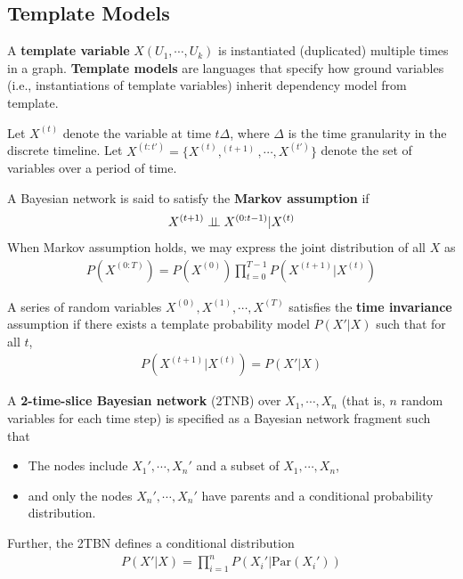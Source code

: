\documentclass[11pt]{article}
\newcommand{\pa}[0]{\text{Par}}
\begin{document}
	\subsection{Template Models}
	\begin{definition}
		A \textbf{template variable} $X(U_1, \cdots, U_k)$ is instantiated (duplicated) multiple times in a graph.
		\textbf{Template models} are languages that specify how ground variables (i.e., instantiations of template variables) inherit dependency model from template.
	\end{definition}
	
	\begin{notation}
		Let $X^{(t)}$ denote the variable at time $t \Delta$, where $\Delta$ is the time granularity in the discrete timeline.
		Let $X^{(t:t')} = \{X^{(t)}, ^{(t+1)}, \cdots, X^{(t')}\}$ denote the set of variables over a period of time.
	\end{notation}
	
	\begin{definition}
		A Bayesian network is said to satisfy the \textbf{Markov assumption} if
		\begin{align}
			X^{(t+1)} \perp \!\!\! \perp X^{(0:t-1)} | X^{(t)}
		\end{align}
		When Markov assumption holds, we may express the joint distribution of all $X$ as
		\begin{align}
			P(X^{(0:T)}) = P(X^{(0)}) \prod_{t=0}^{T-1} P(X^{(t+1)}|X^{(t)})
		\end{align}
	\end{definition}
	
	\begin{definition}
		A series of random variables $X^{(0)}, X^{(1)}, \cdots, X^{(T)}$ satisfies the \textbf{time invariance} assumption if there exists a template probability model $P(X'|X)$ such that for all $t$,
		\begin{align}
			P(X^{(t+1)}|X^{(t)}) = P(X'|X)
		\end{align}
	\end{definition}
	
	\begin{definition}
		A \textbf{2-time-slice Bayesian network} (2TNB) over $X_1, \cdots, X_n$ (that is, $n$ random variables for each time step) is specified as a Bayesian network fragment such that
		\begin{itemize}
			\item The nodes include $X_1', \cdots, X_n'$ and a subset of $X_1, \cdots, X_n$,
			\item and only the nodes $X_n', \cdots, X_n'$ have parents and a conditional probability distribution.
		\end{itemize}
		Further, the 2TBN defines a conditional distribution
		\begin{align}
			P(X'|X) = \prod_{i=1}^n P(X_i' | \pa(X_i'))
		\end{align}
	\end{definition}
	
\end{document}
